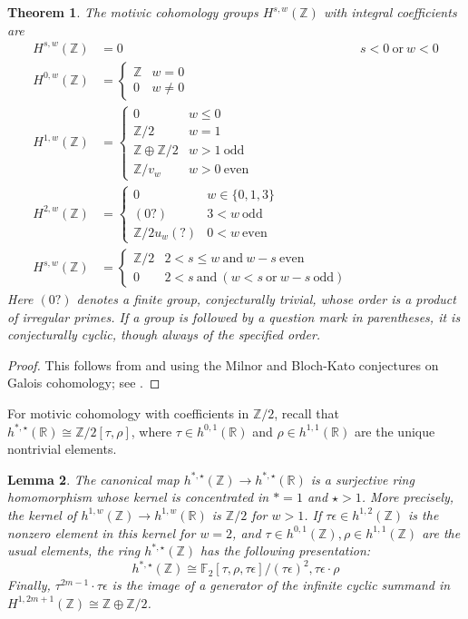 \documentclass[11pt,hyp,english]{article}
\newcommand{\Z}{\mathbb{Z}}
\newcommand{\FF}{\mathbb{F}}
\newcommand{\R}{\mathbb{R}}
\let\iso=\cong
\newtheorem{theorem}{Theorem}[section]
\newtheorem{lemma}[theorem]{Lemma}
\theoremstyle{definition}
\begin{document}
\begin{theorem}\label{thm:HZ}
The motivic cohomology groups $H^{s,w}(\Z)$ with integral coefficients are 
\begin{align*}
    H^{s,w}(\Z) & = 0 & s<0 \mathrm{\ or\ } w<0 \\
    H^{0,w}(\Z) & = \begin{cases} \Z & w=0 \\ 0 & w\neq 0 \end{cases} \\
    H^{1,w}(\Z) & = \begin{cases} 0 & w\leq 0 \\ \Z/2 & w=1 \\ \Z\oplus \Z/2 & w>1 \mathrm{\ odd} \\
     \Z/v_w & w>0 \mathrm{\ even} \end{cases}\\
    H^{2,w}(\Z) & = \begin{cases} 0 & w\in \{0,1,3\} \\ (0?) & 3<w \mathrm{\ odd} \\ \Z/2u_w(?) & 0<w \mathrm{\ even} \end{cases} \\
    H^{s,w}(\Z) & =\begin{cases} \Z/2 & 2<s\leq w \mathrm{\ and\ } w-s \mathrm{\ even} \\ 0 & 2<s \mathrm{\ and\ } (w<s \mathrm{\ or\ } w-s \mathrm{\ odd}) \end{cases}
\end{align*}
Here $(0?)$ denotes a finite group, conjecturally trivial, whose order is a product of irregular primes.  
If a group is followed by a question mark in parentheses, it is conjecturally cyclic, though always of the specified order.  
\end{theorem}

\begin{proof}
This follows from \cite{levine99} and \cite{Weibel:K-book} using the Milnor and Bloch-Kato conjectures on Galois cohomology; see \cite{spitzweck.him}.
\end{proof}

For motivic cohomology with coefficients in $\Z/2$, 
recall that $h^{\ast,\star}(\R)\iso \Z/2[\tau,\rho]$, 
where $\tau\in h^{0,1}(\R)$ and $\rho\in h^{1,1}(\R)$ are the unique nontrivial elements.

\begin{lemma}\label{lem:hZ}
The canonical map $h^{\ast,\star}(\Z)\to h^{\ast,\star}(\R)$ is a surjective ring homomorphism whose kernel is concentrated in $\ast=1$ and $\star>1$. 
More precisely, the kernel of $h^{1,w}(\Z)\to h^{1,w}(\R)$ is $\Z/2$ for $w>1$.
If $\tau\epsilon\in h^{1,2}(\Z)$ is the nonzero element in this kernel for $w=2$, 
and $\tau\in h^{0,1}(\Z),\rho\in h^{1,1}(\Z)$ are the usual elements, 
the ring $h^{\ast,\star}(\Z)$ has the following presentation:
\[ 
h^{\ast,\star}(\Z)\iso 
\FF_2[\tau,\rho,\tau\epsilon]/(\tau\epsilon)^2,\tau\epsilon\cdot \rho
\]
Finally, 
$\tau^{2m-1}\cdot \tau\epsilon $ is the image of a generator of the infinite cyclic summand in 
$H^{1,2m+1}(\Z)\cong \Z\oplus \Z/2$.
\end{lemma}
\end{document}
